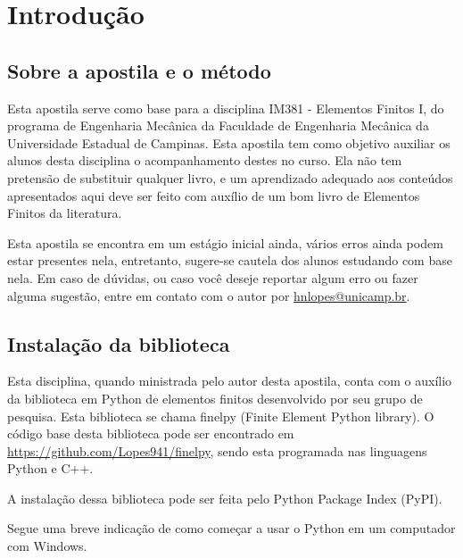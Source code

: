 
\section{Introdução}

    \subsection{Sobre a apostila e o método}

        Esta apostila serve como base para a disciplina IM381 - Elementos Finitos I, do programa de Engenharia Mecânica da Faculdade de Engenharia Mecânica da Universidade Estadual de Campinas. Esta apostila tem como objetivo auxiliar os alunos desta disciplina o acompanhamento destes no curso. Ela não tem pretensão de substituir qualquer livro, e um aprendizado adequado aos conteúdos apresentados aqui deve ser feito com auxílio de um bom livro de Elementos Finitos da literatura. 

        Esta apostila se encontra em um estágio inicial ainda, vários erros ainda podem estar presentes nela, entretanto, sugere-se cautela dos alunos estudando com base nela. Em caso de dúvidas, ou caso você deseje reportar algum erro ou fazer alguma sugestão, entre em contato com o autor por \url{hnlopes@unicamp.br}.

    \subsection{Instalação da biblioteca}

        Esta disciplina, quando ministrada pelo autor desta apostila, conta com o auxílio da biblioteca em Python de elementos finitos desenvolvido por seu grupo de pesquisa. Esta biblioteca se chama finelpy (Finite Element Python library). O código base desta biblioteca pode ser encontrado em \url{https://github.com/Lopes941/finelpy}, sendo esta programada nas linguagens Python e C++.

        A instalação dessa biblioteca pode ser feita pelo Python Package Index (PyPI). 

        \begin{center}
        \end{center}

        
        Segue uma breve indicação de como começar a usar o Python em um computador com Windows.

